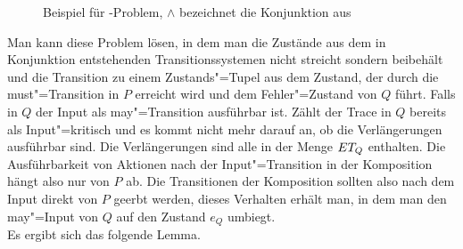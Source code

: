 \begin{figure}[htbp]
  \begin{center}
    \caption{Beispiel für \MIT{}-Problem, $\land$ bezeichnet die Konjunktion
    aus~\cite{Vogler2016MIA3}}
    \label{BspMITConj}
  \end{center}
\end{figure}

Man kann diese Problem lösen, in dem man die Zustände aus dem in Konjunktion
entstehenden Transitionssystemen nicht streicht sondern beibehält und die
Transition zu einem Zustands"=Tupel aus dem Zustand, der durch die
must"=Transition in $P$ erreicht wird und dem Fehler"=Zustand von $Q$ führt.
Falls in $Q$ der Input als may"=Transition ausführbar ist. Zählt der Trace in
$Q$ bereits als Input"=kritisch und es kommt nicht mehr darauf an, ob die
Verlängerungen ausführbar sind. Die Verlängerungen sind alle in der Menge $ET
_Q$ enthalten. Die Ausführbarkeit von Aktionen nach der Input"=Transition in
der Komposition hängt also nur von $P$ ab. Die Transitionen der Komposition
sollten also nach dem Input direkt von $P$ geerbt werden, dieses Verhalten
erhält man, in dem man den may"=Input von $Q$ auf den Zustand $e_Q$ umbiegt.\\
Es ergibt sich das folgende Lemma.

